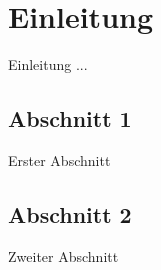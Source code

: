 \chapter{Einleitung}

Einleitung ...


\section{Abschnitt 1}

Erster Abschnitt

\section{Abschnitt 2}

Zweiter Abschnitt


